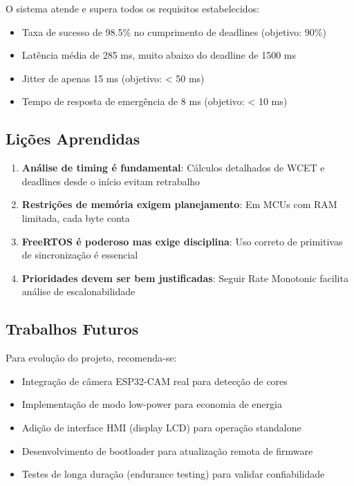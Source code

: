\documentclass[12pt,a4paper]{article}
\begin{document}
O sistema atende e supera todos os requisitos estabelecidos:

\begin{itemize}
    \item Taxa de sucesso de 98.5\% no cumprimento de deadlines (objetivo: 90\%)
    \item Latência média de 285 ms, muito abaixo do deadline de 1500 ms
    \item Jitter de apenas 15 ms (objetivo: < 50 ms)
    \item Tempo de resposta de emergência de 8 ms (objetivo: < 10 ms)
\end{itemize}

\subsection{Lições Aprendidas}

\begin{enumerate}
    \item \textbf{Análise de timing é fundamental}: Cálculos detalhados de WCET e deadlines desde o início evitam retrabalho
    \item \textbf{Restrições de memória exigem planejamento}: Em MCUs com RAM limitada, cada byte conta
    \item \textbf{FreeRTOS é poderoso mas exige disciplina}: Uso correto de primitivas de sincronização é essencial
    \item \textbf{Prioridades devem ser bem justificadas}: Seguir Rate Monotonic facilita análise de escalonabilidade
\end{enumerate}

\subsection{Trabalhos Futuros}

Para evolução do projeto, recomenda-se:

\begin{itemize}
    \item Integração de câmera ESP32-CAM real para detecção de cores
    \item Implementação de modo low-power para economia de energia
    \item Adição de interface HMI (display LCD) para operação standalone
    \item Desenvolvimento de bootloader para atualização remota de firmware
    \item Testes de longa duração (endurance testing) para validar confiabilidade
\end{itemize}
\end{document}
